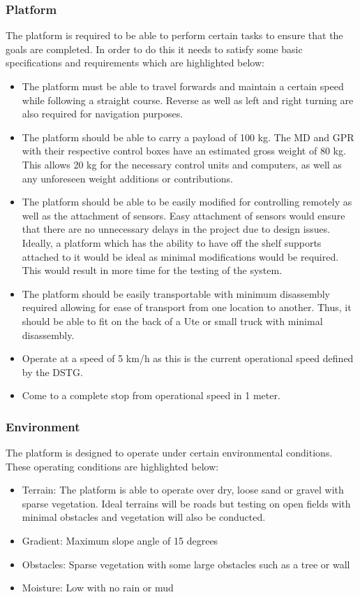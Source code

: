 \documentclass[main.tex]{subfiles}
\begin{document}
\subsubsection{Platform}
The platform is required to be able to perform certain tasks to ensure that the goals are completed. In order to do this it needs to satisfy some basic specifications and requirements which are highlighted below: 
\begin{itemize}
\item The platform must be able to travel forwards and maintain a certain speed while following a straight course. Reverse as well as left and right turning are also required for navigation purposes.
 \item The platform should be able to carry a payload of 100 kg. The MD and GPR with their respective control boxes have an estimated gross weight of 80 kg. This allows 20 kg for the necessary control units and computers, as well as any unforeseen weight additions or contributions. 
\item The platform should be able to be easily modified for controlling remotely as well as the attachment of sensors. Easy attachment of sensors would ensure that there are no unnecessary delays in the project due to design issues. Ideally, a platform which has the ability to have off the shelf supports attached to it would be ideal as minimal modifications would be required. This would result in more time for the testing of the system. 
\item The platform should be easily transportable with minimum disassembly required allowing for ease of transport from one location to another. Thus, it should be able to fit on the back of a Ute or small truck with minimal disassembly. 
\item Operate at a speed of 5 km/h as this is the current operational speed defined by the DSTG.
\item Come to a complete stop from operational speed in 1 meter.
\end{itemize}
\subsubsection{Environment}
The platform is designed to operate under certain environmental conditions. These operating conditions are highlighted below:
\begin{itemize}
\item Terrain: The platform is able to operate over dry, loose sand or gravel with sparse vegetation. Ideal terrains will be roads but testing on open fields with minimal obstacles and vegetation will also be conducted.
\item Gradient: Maximum slope angle of 15 degrees
\item Obstacles: Sparse vegetation with some large obstacles such as a tree or wall
\item Moisture: Low with no rain or mud
\end{itemize}
\end{document}
